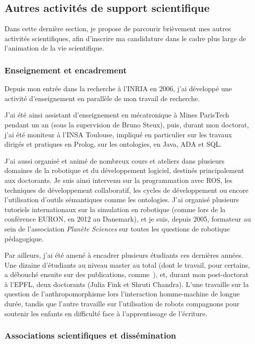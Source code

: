 \documentclass[a4paper]{article}
\begin{document}
\subsection{Autres activités de support scientifique}

Dans cette dernière section, je propose de parcourir brièvement mes autres
activités scientifiques, afin d'inscrire ma candidature dans le cadre plus large
de l'animation de la vie scientifique.

\subsubsection{Enseignement et encadrement}

Depuis mon entrée dans la recherche à l'INRIA en 2006, j'ai développé une
activité d'enseignement en parallèle de mon travail de recherche.

J'ai été ainsi assistant d'enseignement en mécatronique à Mines ParisTech
pendant un an (sous la supervision de Bruno Steux), puis, durant mon doctorat,
j'ai été moniteur à l'INSA Toulouse, impliqué en particulier sur les travaux
dirigés et pratiques en Prolog, sur les ontologies, en Java, ADA et SQL.

J'ai aussi organisé et animé de nombreux cours et ateliers dans plusieurs
domaines de la robotique et du développement logiciel, destinés principalement
aux doctorants. Je suis ainsi intervenu sur la programmation avec ROS, les
techniques de développement collaboratif, les cycles de développement ou encore
l'utilisation d'outils sémantiques comme les ontologies. J'ai organisé plusieurs
tutoriels internationaux sur la simulation en robotique (comme lors de la
conférence EURON, en 2012 au Danemark), et je suis, depuis 2005, formateur au
sein de l'association \emph{Planète Sciences} sur toutes les questions de
robotique pédagogique.

Par ailleurs, j'ai été amené à encadrer plusieurs étudiants ces dernières
années. Une dizaine d'étudiants au niveau master au total (dont le travail, pour
certains, a débouché ensuite sur des publications, comme~\cite{Lemaignan2011a}),
et, durant mon post-doctorat à l'EPFL, deux doctorants (Julia Fink et Shruti
Chandra). L'une travaille sur la question de l'anthropomorphisme lors
l'interaction homme-machine de longue durée, tandis que l'autre travaille sur
l'utilisation de robots compagnons pour soutenir les enfants en difficulté face
à l'apprentissage de l'écriture.

\subsubsection{Associations scientifiques et dissémination}
\end{document}

